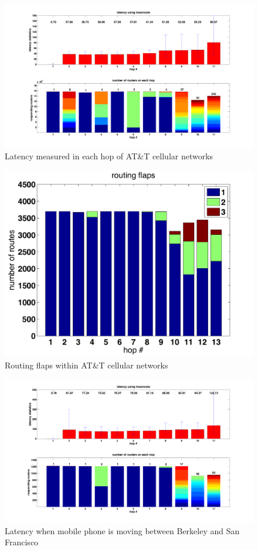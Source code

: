 \begin{figure}
  \centering
  \includegraphics[width=\linewidth]{../figs/mobile_latency.pdf}
  \caption{Latency measured in each hop of AT\&T cellular networks}
  \label{fig:mobile_latency}
\end{figure}

\begin{figure}
  \centering
  \includegraphics[width=\linewidth]{../figs/routing_flaps.pdf}
  \caption{Routing flaps within AT\&T cellular networks}
  \label{fig:mobile_flaps}
\end{figure}

\begin{figure}
  \centering
  \includegraphics[width=\linewidth]{../figs/mobile_sfo.pdf}
  \caption{Latency when mobile phone is moving between Berkeley and San Francisco}
  \label{fig:mobile_mobile}
\end{figure}

